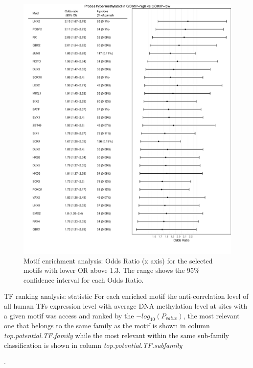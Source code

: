 \begin{center}
\begin{figure}
\includegraphics[width=16cm]{images/gcimp_motif_enrichment.pdf}
\caption[G-CIMP analysis: Odds Ratio plot]{\label{tab:or}Motif enrichment analysis: Odds Ratio (x axis) for the selected motifs with lower OR above 1.3. The range shows the 95\% confidence interval for each Odds Ratio.}
\end{figure}
\end{center}

\begin{table}[h!]
\centering
\caption[G-CIMP analysis: TF ranking plot]{TF ranking analysis: statistic For each enriched motif the anti-correlation level of all human TFs expression level with average DNA methylation level at sites with a given motif was access and ranked by the $-log_{10}(P_{value})$, the most relevant one that belongs to the same family as the motif is shown in column \textit{top.potential.TF.family} while the most relevant within the same sub-family classification is shown in column \textit{top.potential.TF.subfamily}}.
\label{tab:tf}
\end{table}

